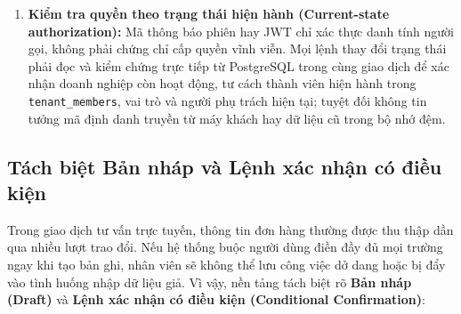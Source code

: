 \begin{enumerate}
  \item \textbf{Kiểm tra quyền theo trạng thái hiện hành (Current-state authorization):} Mã thông báo phiên hay JWT chỉ xác thực danh tính người gọi, không phải chứng chỉ cấp quyền vĩnh viễn. Mọi
    lệnh thay đổi trạng thái phải đọc và kiểm chứng trực tiếp từ PostgreSQL trong cùng giao dịch để xác nhận doanh nghiệp còn hoạt động, tư cách thành viên hiện hành trong
    \texttt{tenant\_\hspace{0pt}members}, vai trò và người phụ trách hiện tại; tuyệt đối không tin tưởng mã định danh truyền từ máy khách hay dữ liệu cũ trong bộ nhớ đệm.
\end{enumerate}

\subsection{Tách biệt Bản nháp và Lệnh xác nhận có điều kiện}
Trong giao dịch tư vấn trực tuyến, thông tin đơn hàng thường được thu thập dần qua nhiều lượt trao đổi. Nếu hệ thống buộc người dùng điền đầy đủ mọi trường ngay khi tạo bản ghi, nhân viên sẽ
không thể lưu công việc dở dang hoặc bị đẩy vào tình huống nhập dữ liệu giả. Vì vậy, nền tảng tách biệt rõ \textbf{Bản nháp (Draft)} và \textbf{Lệnh xác nhận có điều kiện (Conditional
Confirmation)}:
